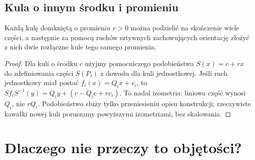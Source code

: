 \subsection{Kula o innym środku i promieniu}
\begin{wniosek}\label{wn:dowolna-kula}
Każdą kulę domkniętą o promieniu $r>0$ można podzielić na skończenie wiele części, a następnie za pomocą ruchów sztywnych zachowujących orientację złożyć z nich dwie rozłączne kule tego samego promienia.
\end{wniosek}
\begin{proof}
Dla kuli o środku $c$ użyjmy pomocniczego podobieństwa $S(x)=c+rx$ do zdefiniowania części $S(P_i)$ z dowodu dla kuli jednostkowej. Jeśli ruch jednostkowy miał postać $f_i(x)=Q_ix+v_i$, to $Sf_iS^{-1}(y)=Q_iy+(c-Q_ic+rv_i)$. To nadal izometria: liniowa część wynosi $Q_i$, nie $rQ_i$. Podobieństwo służy tylko przeniesieniu opisu konstrukcji; rzeczywiste kawałki nowej kuli poruszamy powyższymi izometriami, bez skalowania.
\end{proof}

\section{Dlaczego nie przeczy to objętości?}
